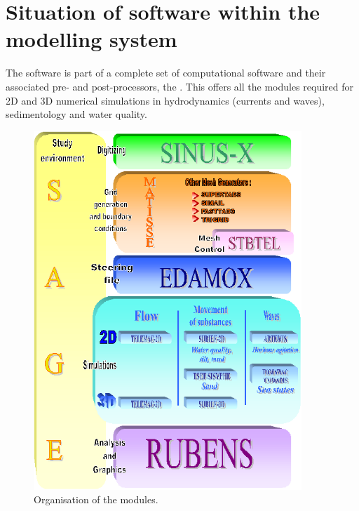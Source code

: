 \section{Situation of \stbtel software within the \telemacsystem modelling system}

The \stbtel software is part of a complete set of computational software and
their associated pre- and post-processors, the \telemacsystem. This offers all
the modules required for 2D and 3D numerical simulations in hydrodynamics
(currents and waves), sedimentology and water quality.\\
%
\begin{figure}[H]%
\begin{center}
%
  \includegraphics[width=0.9\textwidth]{./graphics/orga}
%
\end{center}
\caption
{Organisation of the modules.}
\label{fig:orga}
\end{figure}

